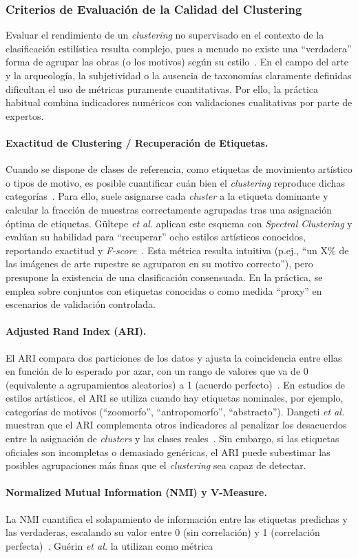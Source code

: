 \subsubsection{Criterios de Evaluación de la Calidad del Clustering } Evaluar el rendimiento de un \textit{clustering} no supervisado en el contexto de la clasificación estilística resulta complejo, pues a menudo no existe una “verdadera” forma de agrupar las obras (o los motivos) según su estilo~\cite{dangeti2024}. En el campo del arte y la arqueología, la subjetividad o la ausencia de taxonomías claramente definidas dificultan el uso de métricas puramente cuantitativas. Por ello, la práctica habitual combina indicadores numéricos con validaciones cualitativas por parte de expertos. \paragraph{Exactitud de Clustering / Recuperación de Etiquetas.} Cuando se dispone de clases de referencia, como etiquetas de movimiento artístico o tipos de motivo, es posible cuantificar cuán bien el \textit{clustering} reproduce dichas categorías~\cite{guerin2018}. Para ello, suele asignarse cada \textit{cluster} a la etiqueta dominante y calcular la fracción de muestras correctamente agrupadas tras una asignación óptima de etiquetas. Gültepe \textit{et al.} aplican este esquema con \textit{Spectral Clustering} y evalúan su habilidad para “recuperar” ocho estilos artísticos conocidos, reportando exactitud y \textit{F-score}~\cite{gultepe2018}. Esta métrica resulta intuitiva (p.ej., “un X\% de las imágenes de arte rupestre se agruparon en su motivo correcto”), pero presupone la existencia de una clasificación consensuada. En la práctica, se emplea sobre conjuntos con etiquetas conocidas o como medida “proxy” en escenarios de validación controlada. \paragraph{Adjusted Rand Index (ARI).} El ARI compara dos particiones de los datos y ajusta la coincidencia entre ellas en función de lo esperado por azar, con un rango de valores que va de 0 (equivalente a agrupamientos aleatorios) a 1 (acuerdo perfecto)~\cite{gultepe2018,guerin2018}. En estudios de estilos artísticos, el ARI se utiliza cuando hay etiquetas nominales, por ejemplo, categorías de motivos (“zoomorfo”, “antropomorfo”, “abstracto”). Dangeti \textit{et al.} muestran que el ARI complementa otros indicadores al penalizar los desacuerdos entre la asignación de \textit{clusters} y las clases reales~\cite{dangeti2024}. Sin embargo, si las etiquetas oficiales son incompletas o demasiado genéricas, el ARI puede subestimar las posibles agrupaciones más finas que el \textit{clustering} sea capaz de detectar. \paragraph{Normalized Mutual Information (NMI) y V-Measure.} La NMI cuantifica el solapamiento de información entre las etiquetas predichas y las verdaderas, escalando su valor entre 0 (sin correlación) y 1 (correlación perfecta)~\cite{dangeti2024,guerin2018}. Guérin \textit{et al.} la utilizan como métrica 